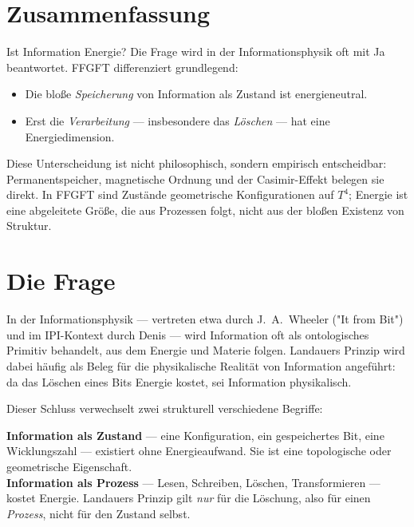 
\section*{Zusammenfassung}

Ist Information Energie? Die Frage wird in der Informationsphysik oft mit Ja
beantwortet. FFGFT differenziert grundlegend:

\begin{itemize}
  \item Die bloße \emph{Speicherung} von Information als Zustand ist energieneutral.
  \item Erst die \emph{Verarbeitung} — insbesondere das \emph{Löschen} — hat
        eine Energiedimension.
\end{itemize}

Diese Unterscheidung ist nicht philosophisch, sondern empirisch entscheidbar:
Permanentspeicher, magnetische Ordnung und der Casimir-Effekt belegen sie
direkt. In FFGFT sind Zustände geometrische Konfigurationen auf $T^4$; Energie
ist eine abgeleitete Größe, die aus Prozessen folgt, nicht aus der bloßen
Existenz von Struktur.

\section{Die Frage}

In der Informationsphysik — vertreten etwa durch J.~A.~Wheeler ("It from Bit")
\cite{Wheeler1990} und im IPI-Kontext durch Denis \cite{Denis2023} — wird
Information oft als ontologisches Primitiv behandelt, aus dem Energie und
Materie folgen. Landauers Prinzip \cite{Landauer1961} wird dabei häufig als
Beleg für die physikalische Realität von Information angeführt: da das Löschen
eines Bits Energie kostet, sei Information physikalisch.

Dieser Schluss verwechselt zwei strukturell verschiedene Begriffe:

\begin{keyresult}
\textbf{Information als Zustand} — eine Konfiguration, ein gespeichertes Bit,
eine Wicklungszahl — existiert ohne Energieaufwand. Sie ist eine topologische
oder geometrische Eigenschaft.\\
\textbf{Information als Prozess} — Lesen, Schreiben, Löschen, Transformieren
— kostet Energie. Landauers Prinzip gilt \emph{nur} für die Löschung, also
für einen \emph{Prozess}, nicht für den Zustand selbst.
\end{keyresult}

